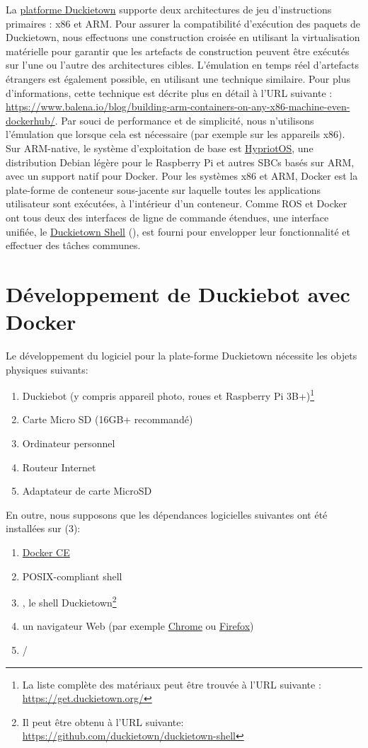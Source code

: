 La \href{https://www.duckietown.org}{platforme Duckietown} supporte deux architectures de jeu d'instructions primaires : x86 et ARM. Pour assurer la compatibilité d'exécution des paquets de Duckietown, nous effectuons une construction croisée en utilisant la virtualisation matérielle pour garantir que les artefacts de construction peuvent être exécutés sur l'une ou l'autre des architectures cibles. L'émulation en temps réel d'artefacts étrangers est également possible, en utilisant une technique similaire. Pour plus d'informations, cette technique est décrite plus en détail à l'URL suivante : \url{https://www.balena.io/blog/building-arm-containers-on-any-x86-machine-even-dockerhub/}. Par souci de performance et de simplicité, nous n'utilisons l'émulation que lorsque cela est nécessaire (par exemple sur les appareils x86). Sur ARM-native, le système d'exploitation de base est \hyperref[subsec:hypriot]{HypriotOS}, une distribution Debian légère pour le Raspberry Pi et autres SBCs basés sur ARM, avec un support natif pour Docker. Pour les systèmes x86 et ARM, Docker est la plate-forme de conteneur sous-jacente sur laquelle toutes les applications utilisateur sont exécutées, à l'intérieur d'un conteneur. Comme ROS et Docker ont tous deux des interfaces de ligne de commande étendues, une interface unifiée, le \href{https://github.com/duckietown/duckietown-shell}{Duckietown Shell} (), est fourni pour envelopper leur fonctionnalité et effectuer des tâches communes.

\section{Développement de Duckiebot avec Docker}

\noindent Le développement du logiciel pour la plate-forme Duckietown nécessite les objets physiques suivants:
%
\begin{enumerate}
\item Duckiebot (y compris appareil photo, roues et Raspberry Pi 3B+)\footnote{La liste complète des matériaux peut être trouvée à l'URL suivante : \url{https://get.duckietown.org/}}
\item Carte Micro SD (16GB+ recommandé)
\item Ordinateur personnel
\item Routeur Internet
\item Adaptateur de carte MicroSD
\end{enumerate}
%
En outre, nous supposons que les dépendances logicielles suivantes ont été installées sur (3):
%
\begin{enumerate}[label=(\alph*)]
\item \href{https://get.docker.com}{Docker CE}
\item POSIX-compliant shell
\item {}, le shell Duckietown\footnote{Il peut être obtenu à l'URL suivante: \url{https://github.com/duckietown/duckietown-shell}}
\item un navigateur Web (par exemple \href{https://www.google.com/chrome/}{Chrome} ou \href{https://mozilla.org/firefox/}{Firefox})
\item {}/
\end{enumerate}

